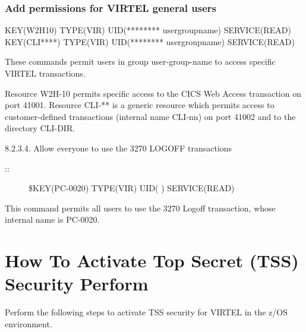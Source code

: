 \documentclass[letterpaper,10pt,english]{sphinxmanual}
\begin{document}
\subsubsection{Add permissions for VIRTEL general users}
\label{\detokenize{Installation_Guide:add-permissions-for-virtel-general-users}}\label{\detokenize{Installation_Guide:index-183}}
\begin{sphinxVerbatim}[commandchars=\\\{\}]
\PYGZdl{}KEY(W2H\PYGZhy{}10) TYPE(VIR) UID(******** user\PYGZhy{}group\PYGZhy{}name) SERVICE(READ)
\PYGZdl{}KEY(CLI\PYGZhy{}****) TYPE(VIR) UID(******** user\PYGZhy{}group\PYGZhy{}name) SERVICE(READ)
\end{sphinxVerbatim}


These commands permit users in group user-group-name to access specific VIRTEL transactions.

Resource W2H-10 permits specific access to the CICS Web Access transaction on port 41001. Resource CLI-** is a generic resource which permits access to customer-defined transactions (internal name CLI-nn) on port 41002 and to the directory CLI-DIR.

8.2.3.4. Allow everyone to use the 3270 LOGOFF transactions
\begin{description}
\item[{::}] \leavevmode
\$KEY(PC-0020) TYPE(VIR) UID(\sphinxstylestrong{****} \sphinxstylestrong{****}) SERVICE(READ)

\end{description}


This command permits all users to use the 3270 Logoff transaction, whose internal name is PC-0020.

\newpage

\ignorespaces 

\section{How To Activate Top Secret (TSS) Security Perform}
\label{\detokenize{Installation_Guide:how-to-activate-top-secret-tss-security-perform}}\label{\detokenize{Installation_Guide:index-184}}
Perform the following steps to activate TSS security for VIRTEL in the z/OS environment.
\end{document}
